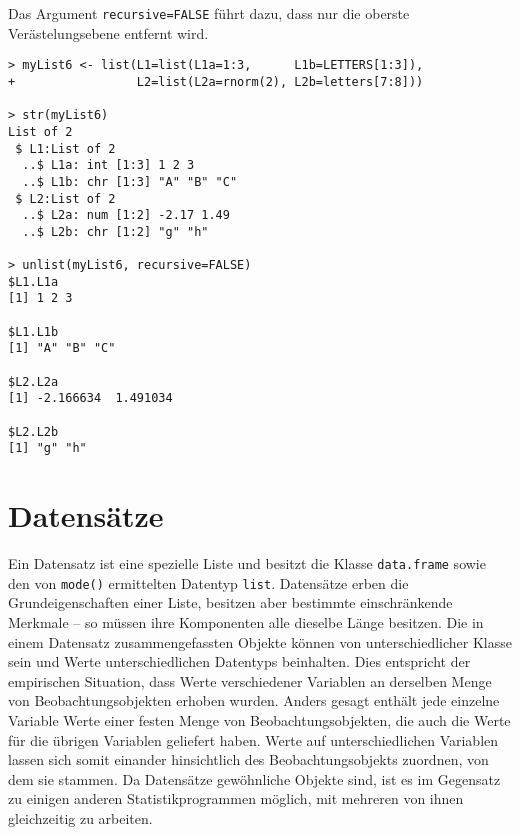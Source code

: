 Das Argument \lstinline!recursive=FALSE! führt dazu, dass nur die oberste Verästelungsebene entfernt wird.
\begin{lstlisting}
> myList6 <- list(L1=list(L1a=1:3,      L1b=LETTERS[1:3]),
+                 L2=list(L2a=rnorm(2), L2b=letters[7:8]))

> str(myList6)
List of 2
 $ L1:List of 2
  ..$ L1a: int [1:3] 1 2 3
  ..$ L1b: chr [1:3] "A" "B" "C"
 $ L2:List of 2
  ..$ L2a: num [1:2] -2.17 1.49
  ..$ L2b: chr [1:2] "g" "h"

> unlist(myList6, recursive=FALSE)
$L1.L1a
[1] 1 2 3

$L1.L1b
[1] "A" "B" "C"

$L2.L2a
[1] -2.166634  1.491034

$L2.L2b
[1] "g" "h"
\end{lstlisting}

\section{Datensätze}
\label{sec:dataframe}


Ein Datensatz ist eine spezielle Liste und besitzt die Klasse \lstinline!data.frame! sowie den von \lstinline!mode()! ermittelten Datentyp \lstinline!list!. Datensätze erben die Grundeigenschaften einer Liste, besitzen aber bestimmte einschränkende Merkmale -- so müssen ihre Komponenten alle dieselbe Länge besitzen. Die in einem Datensatz zusammengefassten Objekte können von unterschiedlicher Klasse sein und Werte unterschiedlichen Datentyps beinhalten. Dies entspricht der empirischen Situation, dass Werte verschiedener Variablen an derselben Menge von Beobachtungsobjekten erhoben wurden. Anders gesagt enthält jede einzelne Variable Werte einer festen Menge von Beobachtungsobjekten, die auch die Werte für die übrigen Variablen geliefert haben. Werte auf unterschiedlichen Variablen lassen sich somit einander hinsichtlich des Beobachtungsobjekts zuordnen, von dem sie stammen. Da Datensätze gewöhnliche Objekte sind, ist es im Gegensatz zu einigen anderen Statistikprogrammen möglich, mit mehreren von ihnen gleichzeitig zu arbeiten.


